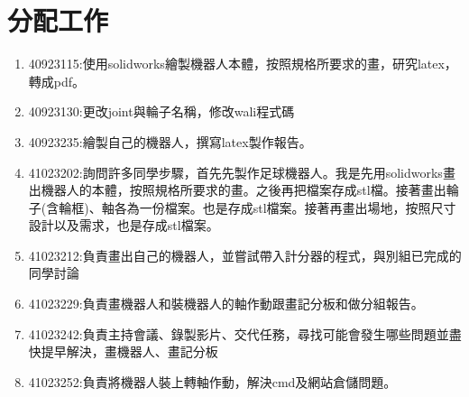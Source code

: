 \chapter{分配工作}
\begin{enumerate}
\item 40923115:使用solidworks繪製機器人本體，按照規格所要求的畫，研究latex，轉成pdf。
\item 40923130:更改joint與輪子名稱，修改wali程式碼 
\item 40923235:繪製自己的機器人，撰寫latex製作報告。
\item 41023202:詢問許多同學步驟，首先先製作足球機器人。我是先用solidworks畫出機器人的本體，按照規格所要求的畫。之後再把檔案存成stl檔。接著畫出輪子(含輪框)、軸各為一份檔案。也是存成stl檔案。接著再畫出場地，按照尺寸設計以及需求，也是存成stl檔案。 
\item 41023212:負責畫出自己的機器人，並嘗試帶入計分器的程式，與別組已完成的同學討論 
\item 41023229:負責畫機器人和裝機器人的軸作動跟畫記分板和做分組報告。 
\item 41023242:負責主持會議、錄製影片、交代任務，尋找可能會發生哪些問題並盡快提早解決，畫機器人、畫記分板 
\item 41023252:負責將機器人裝上轉軸作動，解決cmd及網站倉儲問題。 
\end{enumerate}
\newpage
